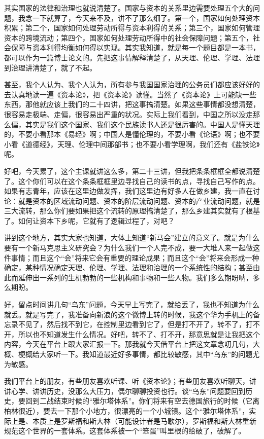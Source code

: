 \documentclass[UTF8, 12pt, a4paper]{ctexrep}
\begin{document}
其实国家的法律和治理也就说清楚了。国家与资本的关系里边需要处理五个大的问题，我念一下就算了，今天来不及，讲不了那么细了。第一个，国家如何处理资本积累；第二个，国家如何处理劳动所得与资本利得的关系；第三个，国家如何管理资本的跨境流动；第四个，国家如何处理劳动所得中的社会保障问题；第五个，社会保障与资本利得均衡如何得以实现。其实我知道，就是每一个题目都是一本书，都可以作为一篇博士论文的。先把这事情解释清楚了，从天理、伦理、学理、法理到治理讲清楚了，就了不起。

甚至，我个人认为、我个人认为，所有参与我国国家治理的公务员们都应该好好的去认真地读一遍《资本论》，把《资本论》读懂。当然了《资本论》上可能缺一些东西，那他就应该上我们的二十四讲，把这事搞清楚。如果这些事情都没想清楚，很容易走极端、走偏，很容易出严重的状况。实际上我们看到，中国之所以没走那么偏，其实是我们这个国家、我们这个民族读书人还是很厉害的。中国人是懂天理的，不要小看那本《易经》啊；中国人是懂伦理的，不要小看《论语》啊；也不要小看《道德经》，天理、伦理中间那部书；也不要小看学理啊，我们还有《盐铁论》呢。

好吧，今天累了，这个主课就讲这么多，第二十三讲，但我把条条框框全都说清楚了。这个你们可以在这个条条框框里边寻找自己的读书的点，寻找自己写作的点。如果有志青年，应该在这里边做发挥，我们这里边有好多人在做乡建，我一直在讨论：就是资本的区域流动问题、资本的阶层流动问题、资本的产业流动问题，就是三大流转，那么你们要如果把这个流转的原理搞清楚了，那么乡建其实就有了根基了。如何让资本下乡呢，它就有了逻辑过程了，对吧？

讲到这个地方，其实大家也知道，大体上知道“新马会”建立的意义了。就是为什么要有一个新马克思主义研究会？为什么我们一个人完不成，要一大堆人来一起做这件事情；而且这个“会”将来它会有重要的理论成果；而且这个“会”将来会形成一种确定，某种情况确定天理、伦理、学理、法理和治理的一个系统性的结构；甚至由此而延伸出一系列的生机勃勃的一些机构和事物和一些人物。我们多么期盼呐，多么期盼。

好，留点时间讲几句“乌东”问题，今天早上写完了，就给丢了，我也不知道为什么就丢。就是写完了，我准备向新浪的这个微博上转的时候，我这个华为手机上的备忘录不见了，然后找不到它，在控制里边看到它了，但是打不开了，转不了，打不开，所以也不知道发生什么情况。好吧，转不了、打不开，那意思就是让我把这个内容，今天在平台上跟大家汇报一下。那我就今天借平台上把这文章念叨几句，大概、梗概给大家听一下。我知道最近好多事情，都比较敏感，其中“乌东”的问题尤为敏感。

我们平台上的朋友，有些朋友喜欢听课、听《资本论》；有些朋友喜欢听聊天，讲讲心学、讲讲历史，没那么大压力，偶尔聊聊投资也行。谈“乌东”问题要回到历史，要回到二战结束时候的“雅尔塔体系”。你们将来有空去德国旅行的时候（它离柏林很近），要去一下那个小地方，很漂亮的一个小城镇。这个“雅尔塔体系”，实际上是、本质上是罗斯福和斯大林（可能设计者是马歇尔），罗斯福和斯大林重新规范这个世界的一套体系。这套体系被一个“笨蛋”叫里根的给破了，破解了。
\end{document}
